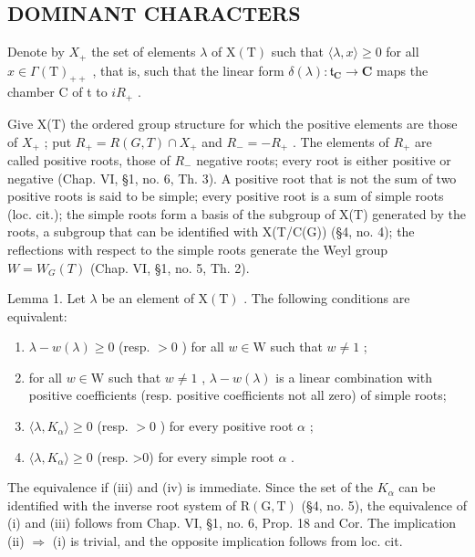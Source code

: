 \subsection{DOMINANT CHARACTERS}

Denote by \(X_{+}\) the set of elements \(\lambda\) of \(\mathrm{X(T)}\) such that \(\langle\lambda,x\rangle\geq0\) for all \(x\in\Gamma(\mathrm{T})_{++}\) , that is, such that the linear form \(\delta(\lambda):\mathfrak{t}_{\mathbf{C}}\to\mathbf{C}\) maps the chamber C of t to \(iR_{+}\) .

Give X(T) the ordered group structure for which the positive elements are those of \(X_{+}\) ; put \(R_{+} = R(G, T) \cap X_{+}\) and \(R_{-} = -R_{+}\) . The elements of \(R_{+}\) are called positive roots, those of \(R_{-}\) negative roots; every root is either positive or negative (Chap. VI, §1, no. 6, Th. 3). A positive root that is not the sum of two positive roots is said to be simple; every positive root is a sum of simple roots (loc. cit.); the simple roots form a basis of the subgroup of X(T) generated by the roots, a subgroup that can be identified with X(T/C(G)) (§4, no. 4); the reflections with respect to the simple roots generate the Weyl group \(W = W_{G}(T)\) (Chap. VI, §1, no. 5, Th. 2).

Lemma 1. Let \(\lambda\) be an element of \(\mathrm{X(T)}\) . The following conditions are equivalent:

\begin{enumerate}
\def\labelenumi{(\roman{enumi})}
\item
  \(\lambda - w(\lambda) \geq 0\) (resp. \(>0\) ) for all \(w \in \mathrm{W}\) such that \(w \neq 1\) ;
\item
  for all \(w \in \mathrm{W}\) such that \(w \neq 1\) , \(\lambda - w(\lambda)\) is a linear combination with positive coefficients (resp. positive coefficients not all zero) of simple roots;
\item
  \(\langle \lambda, K_{\alpha} \rangle \geq 0\) (resp. \(>0\) ) for every positive root \(\alpha\) ;
\item
  \(\langle\lambda,K_{\alpha}\rangle\geq0\) (resp. >0) for every simple root \(\alpha\) .
\end{enumerate}

The equivalence if (iii) and (iv) is immediate. Since the set of the \(K_{\alpha}\) can be identified with the inverse root system of \(\mathrm{R}(\mathrm{G},\mathrm{T})\) (§4, no. 5), the equivalence of (i) and (iii) follows from Chap. VI, §1, no. 6, Prop. 18 and Cor. The implication (ii) \(\Rightarrow\) (i) is trivial, and the opposite implication follows from loc. cit.

